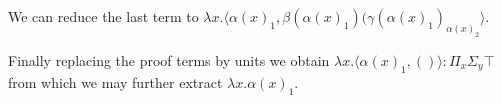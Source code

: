 \documentclass[onehalfspacing]{article}
\begin{document}
\hfill
\\\\\hspace{2cm}We can reduce the last term to $\lambda x.\langle \alpha(x)_1, \beta(\alpha(x)_1)(\gamma(\alpha(x)_1)_{\alpha(x)_2}\rangle$.

\noindent Finally replacing the proof terms by units we obtain $\lambda x.\langle \alpha(x)_1, ()\rangle : \Pi_x\Sigma_y \top$ from which we may further extract $\lambda x. \alpha(x)_1$.


\pagebreak


\end{document}
